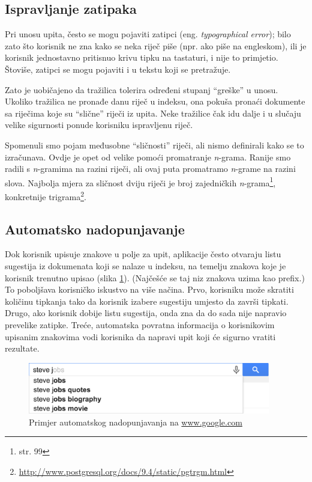 \documentclass[a4paper,twoside,12pt]{scrreprt}
\begin{document}
\subsection{Ispravljanje zatipaka}

Pri unosu upita, često se mogu pojaviti zatipci (eng. \textit{typographical error}); bilo zato što korisnik ne zna kako se neka riječ piše (npr. ako piše na engleskom), ili je korisnik jednostavno pritisnuo krivu tipku na tastaturi, i nije to primjetio. Štoviše, zatipci se mogu pojaviti i u tekstu koji se pretražuje.

Zato je uobičajeno da tražilica tolerira određeni stupanj ``greške'' u unosu. Ukoliko tražilica ne pronađe danu riječ u indeksu, ona pokuša pronaći dokumente sa riječima koje su ``slične'' riječi iz upita. Neke tražilice čak idu dalje i u slučaju velike sigurnosti ponude korisniku ispravljenu riječ.

Spomenuli smo pojam međusobne ``sličnosti'' riječi, ali nismo definirali kako se to izračunava. Ovdje je opet od velike pomoći promatranje \textit{n}-grama. Ranije smo radili s \textit{n}-gramima na razini riječi, ali ovaj puta promatramo \textit{n}-grame na razini slova. Najbolja mjera za sličnost dviju riječi je broj zajedničkih \textit{n}-grama\footnote{\cite{taming} str. 99}, konkretnije trigrama\footnote{\url{http://www.postgresql.org/docs/9.4/static/pgtrgm.html}}.

\subsection{Automatsko nadopunjavanje}

Dok korisnik upisuje znakove u polje za upit, aplikacije često otvaraju listu sugestija iz dokumenata koji se nalaze u indeksu, na temelju znakova koje je korisnik trenutno upisao (slika \ref{typeahead}). (Najčešće se taj niz znakova uzima kao prefix.) To poboljšava korisničko iskustvo na više načina. Prvo, korisniku može skratiti količinu tipkanja tako da korisnik izabere sugestiju umjesto da završi tipkati. Drugo, ako korisnik dobije listu sugestija, onda zna da do sada nije napravio prevelike zatipke. Treće, automatska povratna informacija o korisnikovim upisanim znakovima vodi korisnika da napravi upit koji će sigurno vratiti rezultate.

\begin{figure}[H]
  \centering
  \includegraphics[width=300pt]{typeahead}
  \caption{Primjer automatskog nadopunjavanja na \url{www.google.com}}
  \label{typeahead}
\end{figure}
\end{document}
